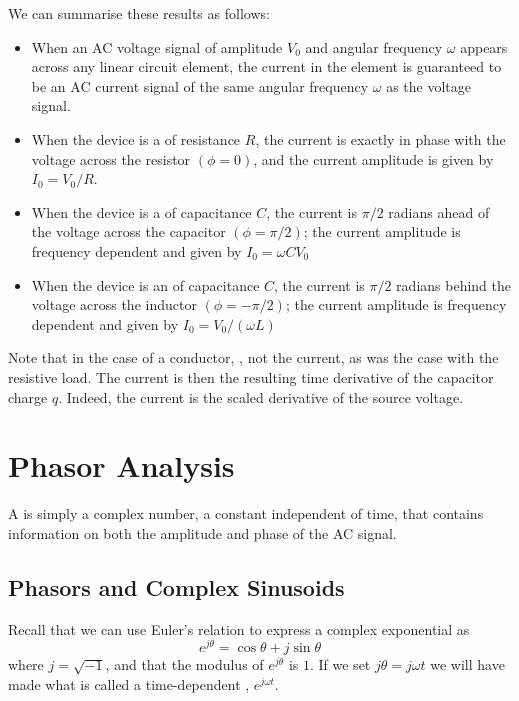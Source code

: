 \documentclass[12pt, a4paper, oneside, openright, titlepage]{book}
\begin{document}
We can summarise these results as follows: \begin{itemize}
    \item When an AC voltage signal of amplitude $V_0$ and angular frequency $\omega$ appears across any linear circuit element, the current in the element is guaranteed to be an AC current signal of the same angular frequency $\omega$ as the voltage signal.
    \item When the device is a  of resistance $R$, the current is exactly in phase with the voltage across the resistor $(\phi = 0)$, and the current amplitude is given by $I_0 = V_0/R$.
    \item When the device is a  of capacitance $C$, the current is $\pi/2$ radians ahead of the voltage across the capacitor $(\phi = \pi/2)$; the current amplitude is frequency dependent and given by $I_0 = \omega CV_0$
    \item When the device is an  of capacitance $C$, the current is $\pi/2$ radians behind the voltage across the inductor $(\phi = -\pi/2)$; the current amplitude is frequency dependent and given by $I_0 = V_0/(\omega L)$
\end{itemize}

Note that in the case of a conductor, , not the current, as was the case with the resistive load. The current is then the resulting time derivative of the capacitor charge $q$. Indeed, the current is the scaled derivative of the source voltage. 


\chapter{Phasor Analysis}

A  is simply a complex number, a constant independent of time, that contains information on both the amplitude and phase of the AC signal. 

\section{Phasors and Complex Sinusoids}

Recall that we can use Euler's relation to express a complex exponential as $$e^{j\theta} = \cos\theta + j\sin\theta$$ where $j = \sqrt{-1}$, and that the modulus of $e^{j\theta}$ is $1$. If we set $j\theta = j\omega t$ we will have made what is called a time-dependent , $e^{j\omega t}$.
\end{document}
